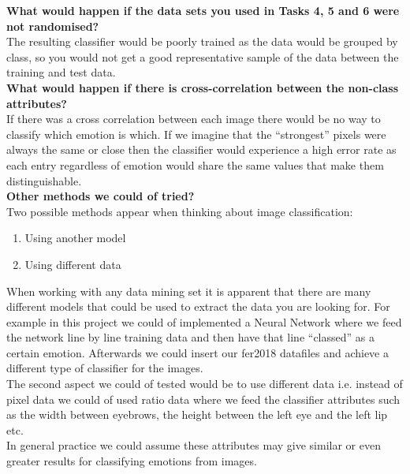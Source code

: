 \documentclass[12pt]{article}
\begin{document}
\textbf{What would happen if the data sets you used in Tasks 4, 5 and 6 were not randomised?}\\

The resulting classifier would be poorly trained as the data would be grouped by class, so you would not get a good representative sample of the data between the training and test data.\\

\textbf{What would happen if there is cross-correlation between the non-class attributes? }\\

If there was a cross correlation between each image there would be no way to classify which emotion is which. If we imagine that the “strongest” pixels were always the same or close then the classifier would experience a high error rate as each entry regardless of emotion would share the same values that make them distinguishable.\\ 


\textbf{Other methods we could of tried? }\\

Two possible methods appear when thinking about image classification:

\begin{enumerate}
	\item Using another model
	\item Using different data
\end{enumerate}

When working with any data mining set it is apparent that there are many different models that could be used to extract the data you are looking for. For example in this project we could of implemented a Neural Network where we feed the network line by line training data and then have that line “classed” as a certain emotion. Afterwards we could insert our fer2018 datafiles and achieve a different type of classifier for the images.\\

The second aspect we could of tested would be to use different data i.e. instead of pixel data we could of used ratio data where we feed the classifier attributes such as the width between eyebrows, the height between the left eye and the left lip etc.\\ 

In general practice we could assume these attributes may give similar or even greater results for classifying emotions from images.\\
\end{document}
